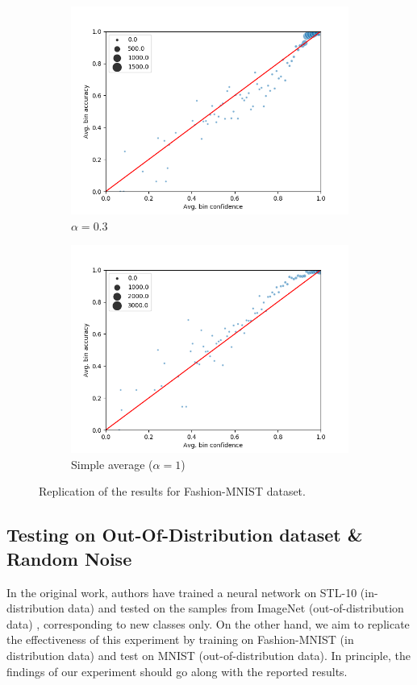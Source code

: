 \documentclass{article}
\begin{document}
\begin{figure}[h]
\begin{subfigure}[b]{0.31\textwidth}
         \centering
         \noindent\includegraphics[width=\textwidth]{images/fmnist/scatterplot_0-3.png}
         \caption{$\alpha=0.3$}
     \end{subfigure}
     \begin{subfigure}[b]{0.31\textwidth}
         \centering
         \noindent\includegraphics[width=\textwidth]{images/fmnist/scatterplot_1.png}
         \caption{Simple average ($\alpha=1$)}
     \end{subfigure}
        \caption{Replication of the results for Fashion-MNIST dataset.}
        \label{fig:fmnist}
\end{figure}

\subsection{Testing on Out-Of-Distribution dataset \& Random Noise}
\label{sec:ood}
In the original work, authors have trained a neural network on STL-10 (in-distribution data) and tested on the samples from ImageNet (out-of-distribution data) \cite{imagenet_cvpr09}, corresponding to new classes only. On the other hand, we aim to replicate the effectiveness of this experiment by training on Fashion-MNIST (in distribution data) and test on MNIST (out-of-distribution data). In principle, the findings of our experiment should go along with the reported results.
\end{document}
